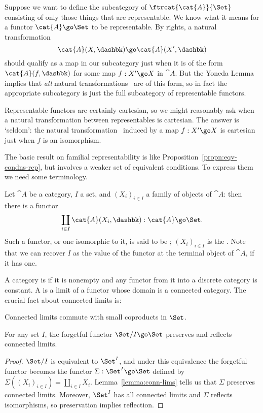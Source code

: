 Suppose we want to define the subcategory of $\ftrcat{\cat{A}}{\Set}$
consisting of only those things that are representable.  We know what it
means for a functor $\cat{A} \go \Set$ to be representable.  By rights, a
natural transformation
%
\begin{equation}	\label{eq:rep-transf}
\cat{A}(X, \dashbk) \go \cat{A}(X', \dashbk)
\end{equation}
%
should qualify as a map in our subcategory just when it is of the form
$\cat{A}(f, \dashbk)$ for some map $f:X' \go X$ in $\cat{A}$.  But the
Yoneda Lemma implies that \emph{all} natural
transformations~ are of this form, so in fact the
appropriate subcategory is just the full subcategory of representable
functors.

Representable functors are certainly cartesian, so we might reasonably ask
when a natural transformation between representables is cartesian.%
%
%
 The
answer is `seldom': the natural transformation~
induced by a map $f: X' \go X$ is cartesian just when $f$ is an
isomorphism.%
%
%

The basic result on familial representability is like
Proposition~\ref{propn:eqv-condns-rep}, but involves a weaker set of
equivalent conditions.  To express them we need some terminology.

Let $\cat{A}$ be a category, $I$ a set, and $(X_i)_{i\in I}$
a family of objects of $\cat{A}$: then there is a functor
\[
\coprod_{i\in I} \cat{A}(X_i, \dashbk): \cat{A} \go \Set.
\]
Such a functor, or one isomorphic to it, is said to be ;%
%
%
$(X_i)_{i\in I}$ is the .  Note
that we can recover $I$ as the value of the functor at the terminal object
of $\cat{A}$, if it has one.

A category is %
%
%
if it is nonempty and any functor from it
into a discrete category is constant.  A %
%
%
is a limit
of a functor whose domain is a connected category.  The crucial fact about
connected limits is:
%
\begin{lemma}	
Connected limits commute with small coproducts in $\Set$.
\done
\end{lemma}
%

\begin{cor}	
For any set $I$, the forgetful functor $\Set/I \go \Set$ preserves and
reflects connected limits.
\end{cor}
%
\begin{proof}
$\Set/I$ is equivalent to $\Set^I$, and under this equivalence the
forgetful functor becomes the functor $\Sigma: \Set^I \go \Set$ defined by
$\Sigma((X_i)_{i\in I}) = \coprod_{i\in I} X_i$.
Lemma~\ref{lemma:conn-lims} tells us that $\Sigma$ preserves connected
limits.  Moreover, $\Set^I$ has all connected limits and $\Sigma$ reflects
isomorphisms, so preservation implies reflection.  \done
\end{proof}

